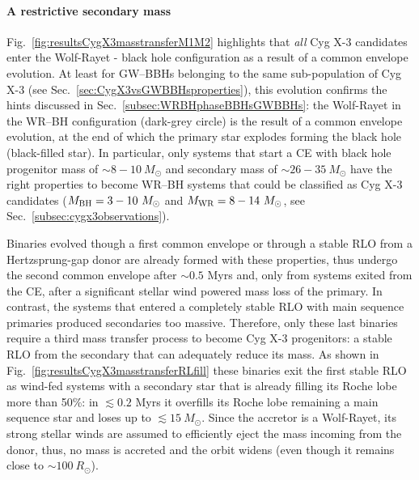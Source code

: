\documentclass[a4paper,titlepage]{book}     	%
\newcommand{\sun}{\ensuremath{_\odot}}
\newcommand{\msun}{\ensuremath{M\sun}}
\newcommand{\rsun}{R_{\odot}}
\newcommand{\mwr}{\ensuremath{M_\textup{WR}}}
\newcommand{\mbh}{\ensuremath{M_\textup{BH}}}
\begin{document}
\paragraph{A restrictive secondary mass} Fig.\ \ref{fig:resultsCygX3masstransferM1M2} highlights that \emph{all} Cyg X-3 candidates enter the Wolf-Rayet - black hole configuration as a result of a common envelope evolution. At least for GW--BBHs belonging to the same sub-population of Cyg X-3 (see Sec.\ \ref{sec:CygX3vsGWBBHsproperties}), this evolution confirms the hints discussed in Sec.\ \ref{subsec:WRBHphaseBBHsGWBBHs}: the Wolf-Rayet in the WR--BH configuration (dark-grey circle) is the result of a common envelope evolution, at the end of which the primary star explodes forming the black hole (black-filled star). In particular, only systems that start a CE with black hole progenitor mass of $\sim 8-10~\msun$ and secondary mass of $\sim 26-35~\msun$ have the right properties to become WR--BH systems that could be classified as Cyg X-3 candidates ($\mbh = 3-10~\msun$ and $\mwr = 8-14~\msun$, see Sec.\ \ref{subsec:cygx3observations}).

Binaries evolved though a first common envelope or through a stable RLO from a Hertzsprung-gap donor are already formed with these properties, thus undergo the second common envelope after $\sim 0.5$ Myrs and, only from systems exited from the CE, after a significant stellar wind powered mass loss of the primary. In contrast, the systems that entered a completely stable RLO with main sequence primaries produced secondaries too massive. Therefore, only these last binaries require a third mass transfer process to become Cyg X-3 progenitors: a stable RLO from the secondary that can adequately reduce its mass. As shown in Fig.\ \ref{fig:resultsCygX3masstransferRLfill} these binaries exit the first stable RLO as wind-fed systems with a secondary star that is already filling its Roche lobe more than 50\%: in $\lesssim 0.2$ Myrs it overfills its Roche lobe remaining a main sequence star and loses up to $\lesssim 15~\msun$. Since the accretor is a Wolf-Rayet, its strong stellar winds are assumed to efficiently eject the mass incoming from the donor, thus, no mass is accreted and the orbit widens (even though it remains close to $\sim 100~\rsun$).
\end{document}

